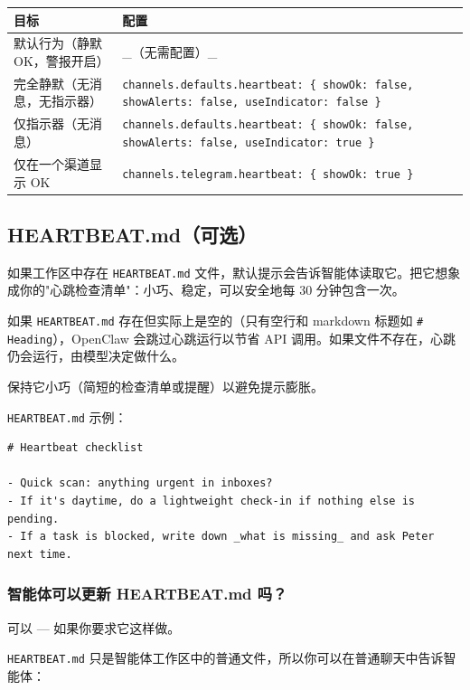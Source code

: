 \begin{table}[h]
\centering
\small
\begin{tabular}{|l|l|}
\hline
目标 & 配置 \\
\hline
默认行为（静默 OK，警报开启） & \_（无需配置）\_ \\
\hline
完全静默（无消息，无指示器） & \texttt{channels.defaults.heartbeat: \{ showOk: false, showAlerts: false, useIndicator: false \}} \\
\hline
仅指示器（无消息） & \texttt{channels.defaults.heartbeat: \{ showOk: false, showAlerts: false, useIndicator: true \}} \\
\hline
仅在一个渠道显示 OK & \texttt{channels.telegram.heartbeat: \{ showOk: true \}} \\
\hline
\end{tabular}
\end{table}



\subsection{HEARTBEAT.md（可选）}


如果工作区中存在 \texttt{HEARTBEAT.md} 文件，默认提示会告诉智能体读取它。把它想象成你的"心跳检查清单"：小巧、稳定，可以安全地每 30 分钟包含一次。

如果 \texttt{HEARTBEAT.md} 存在但实际上是空的（只有空行和 markdown 标题如 \texttt{\# Heading}），OpenClaw 会跳过心跳运行以节省 API 调用。如果文件不存在，心跳仍会运行，由模型决定做什么。

保持它小巧（简短的检查清单或提醒）以避免提示膨胀。

\texttt{HEARTBEAT.md} 示例：

\begin{lstlisting}
# Heartbeat checklist

- Quick scan: anything urgent in inboxes?
- If it's daytime, do a lightweight check-in if nothing else is pending.
- If a task is blocked, write down _what is missing_ and ask Peter next time.
\end{lstlisting}


\subsubsection{智能体可以更新 HEARTBEAT.md 吗？}


可以 — 如果你要求它这样做。

\texttt{HEARTBEAT.md} 只是智能体工作区中的普通文件，所以你可以在普通聊天中告诉智能体：


